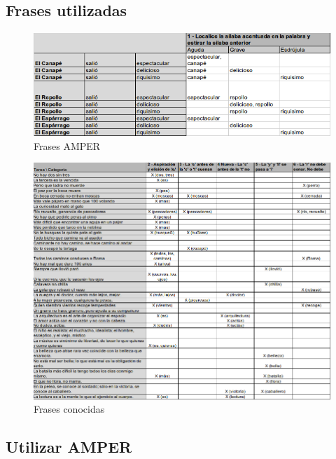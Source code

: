 \documentclass[11pt,a4paper,twoside]{tesis}
\begin{document}
\subsection{Frases utilizadas}

\begin{figure}[h!]
    \centerline{\includegraphics[width=1\textwidth]{reglas_AMPER} }
    \caption{Frases AMPER}
\end{figure}

\begin{figure}[h!]
    \centerline{\includegraphics[width=1\textwidth]{frases_inf} }
    \caption{Frases conocidas}
\end{figure}

\subsection{Utilizar AMPER}

\end{document}
